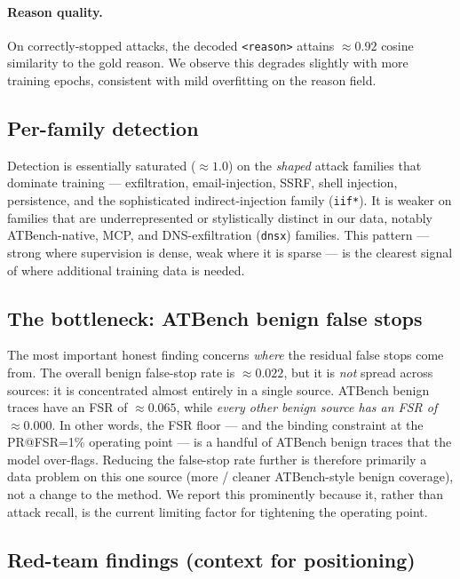 \paragraph{Reason quality.}
On correctly-stopped attacks, the decoded \texttt{<reason>} attains
$\approx 0.92$ cosine similarity to the gold reason. We observe this degrades
slightly with more training epochs, consistent with mild overfitting on the
reason field.

\subsection{Per-family detection}
\label{sec:experiments:family}

Detection is essentially saturated ($\approx 1.0$) on the \emph{shaped} attack
families that dominate training --- exfiltration, email-injection, SSRF, shell
injection, persistence, and the sophisticated indirect-injection family
(\texttt{iif*}). It is weaker on families that are underrepresented or stylistically
distinct in our data, notably ATBench-native, MCP, and DNS-exfiltration
(\texttt{dnsx}) families. This pattern --- strong where supervision is dense,
weak where it is sparse --- is the clearest signal of where additional training
data is needed. %

\subsection{The bottleneck: ATBench benign false stops}
\label{sec:experiments:bottleneck}

The most important honest finding concerns \emph{where} the residual false
stops come from. The overall benign false-stop rate is $\approx 0.022$, but it
is \emph{not} spread across sources: it is concentrated almost entirely in a
single source. ATBench benign traces have an FSR of $\approx 0.065$, while
\emph{every other benign source has an FSR of $\approx 0.000$}. In other words,
the FSR floor --- and the binding constraint at the PR@FSR=1\% operating point
--- is a handful of ATBench benign traces that the model over-flags. Reducing
the false-stop rate further is therefore primarily a data problem on this one
source (more / cleaner ATBench-style benign coverage), not a change to the
method. We report this prominently because it, rather than attack recall, is the
current limiting factor for tightening the operating point.

\subsection{Red-team findings (context for positioning)}
\label{sec:experiments:redteam}

